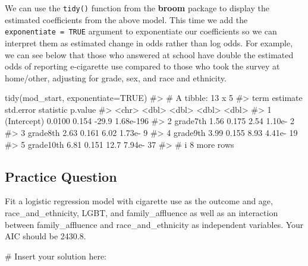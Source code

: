 \documentclass[
  letterpaper,
]{krantz}
\makeatletter
\newenvironment{Shaded}{\begin{snugshade}}{\end{snugshade}}
\newcommand{\AttributeTok}[1]{\textcolor[rgb]{0.40,0.45,0.13}{#1}}
\newcommand{\CommentTok}[1]{\textcolor[rgb]{0.37,0.37,0.37}{#1}}
\newcommand{\ConstantTok}[1]{\textcolor[rgb]{0.56,0.35,0.01}{#1}}
\newcommand{\FunctionTok}[1]{\textcolor[rgb]{0.28,0.35,0.67}{#1}}
\newcommand{\NormalTok}[1]{\textcolor[rgb]{0.00,0.23,0.31}{#1}}
\newenvironment{kframe}{%
\medskip{}
\setlength{\fboxsep}{.8em}
 \def\at@end@of@kframe{}%
 \ifinner\ifhmode%
  \def\at@end@of@kframe{\end{minipage}}%
  \begin{minipage}{\columnwidth}%
 \fi\fi%
 \def\FrameCommand##1{\hskip\@totalleftmargin \hskip-\fboxsep
 \colorbox{shadecolor}{##1}\hskip-\fboxsep
     \hskip-\linewidth \hskip-\@totalleftmargin \hskip\columnwidth}%
 \MakeFramed {\advance\hsize-\width
   \@totalleftmargin\z@ \linewidth\hsize
   \@setminipage}}%
 {\par\unskip\endMakeFramed%
 \at@end@of@kframe}
\renewenvironment{Shaded}{\begin{kframe}}{\end{kframe}}
\makeatother
\begin{document}
We can use the \texttt{tidy()} function from the \textbf{broom} package
to display the estimated coefficients from the above model. This time we
add the \texttt{exponentiate\ =\ TRUE} argument to exponentiate our
coefficients so we can interpret them as estimated change in odds rather
than log odds. For example, we can see below that those who answered at
school have double the estimated odds of reporting e-cigarette use
compared to those who took the survey at home/other, adjusting for
grade, sex, and race and ethnicity.

\begin{Shaded}
\begin{Highlighting}[]
\FunctionTok{tidy}\NormalTok{(mod\_start, }\AttributeTok{exponentiate=}\ConstantTok{TRUE}\NormalTok{)}
\CommentTok{\#\textgreater{} \# A tibble: 13 x 5}
\CommentTok{\#\textgreater{}   term        estimate std.error statistic   p.value}
\CommentTok{\#\textgreater{}   \textless{}chr\textgreater{}          \textless{}dbl\textgreater{}     \textless{}dbl\textgreater{}     \textless{}dbl\textgreater{}     \textless{}dbl\textgreater{}}
\CommentTok{\#\textgreater{} 1 (Intercept)   0.0100     0.154    {-}29.9  1.68e{-}196}
\CommentTok{\#\textgreater{} 2 grade7th      1.56       0.175      2.54 1.10e{-}  2}
\CommentTok{\#\textgreater{} 3 grade8th      2.63       0.161      6.02 1.73e{-}  9}
\CommentTok{\#\textgreater{} 4 grade9th      3.99       0.155      8.93 4.41e{-} 19}
\CommentTok{\#\textgreater{} 5 grade10th     6.81       0.151     12.7  7.94e{-} 37}
\CommentTok{\#\textgreater{} \# i 8 more rows}
\end{Highlighting}
\end{Shaded}

\subsection{Practice Question}\label{practice-question-23}

Fit a logistic regression model with cigarette use as the outcome and
age, race\_and\_ethnicity, LGBT, and family\_affluence as well as an
interaction between family\_affluence and race\_and\_ethnicity as
independent variables. Your AIC should be 2430.8.

\begin{Shaded}
\begin{Highlighting}[]
\CommentTok{\# Insert your solution here:}
\end{Highlighting}
\end{Shaded}
\end{document}
